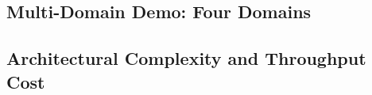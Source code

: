 \subsection{Multi-Domain Demo: Four Domains}
\label{sub:multi_domain}


\subsection{Architectural Complexity and Throughput Cost}
\label{sub:cost}

